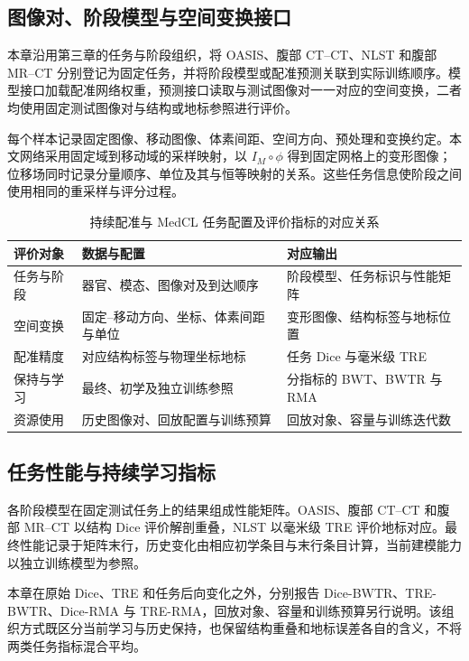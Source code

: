 \subsection{图像对、阶段模型与空间变换接口}

本章沿用第三章的任务与阶段组织，将 OASIS、腹部 CT--CT、NLST 和腹部 MR--CT 分别登记为固定任务，并将阶段模型或配准预测关联到实际训练顺序。模型接口加载配准网络权重，预测接口读取与测试图像对一一对应的空间变换，二者均使用固定测试图像对与结构或地标参照进行评价。

每个样本记录固定图像、移动图像、体素间距、空间方向、预处理和变换约定。本文网络采用固定域到移动域的采样映射，以 $I_M\circ\phi$ 得到固定网格上的变形图像；位移场同时记录分量顺序、单位及其与恒等映射的关系。这些任务信息使阶段之间使用相同的重采样与评分过程。

\begin{table}[htbp]
\centering
\caption{持续配准与 MedCL 任务配置及评价指标的对应关系}
\label{tab:samcl-platform-interface}
\thesistablefont
\renewcommand{\arraystretch}{1.16}
\setlength{\tabcolsep}{3pt}
\begin{tabularx}{\textwidth}{@{}p{2.4cm}XX@{}}
\toprule
评价对象 & 数据与配置 & 对应输出 \\
\midrule
任务与阶段 & 器官、模态、图像对及到达顺序 & 阶段模型、任务标识与性能矩阵 \\
空间变换 & 固定--移动方向、坐标、体素间距与单位 & 变形图像、结构标签与地标位置 \\
配准精度 & 对应结构标签与物理坐标地标 & 任务 Dice 与毫米级 TRE \\
保持与学习 & 最终、初学及独立训练参照 & 分指标的 BWT、BWTR 与 RMA \\
资源使用 & 历史图像对、回放配置与训练预算 & 回放对象、容量与训练迭代数 \\
\bottomrule
\end{tabularx}
\end{table}

\subsection{任务性能与持续学习指标}

各阶段模型在固定测试任务上的结果组成性能矩阵。OASIS、腹部 CT--CT 和腹部 MR--CT 以结构 Dice 评价解剖重叠，NLST 以毫米级 TRE 评价地标对应。最终性能记录于矩阵末行，历史变化由相应初学条目与末行条目计算，当前建模能力以独立训练模型为参照。

本章在原始 Dice、TRE 和任务后向变化之外，分别报告 Dice-BWTR、TRE-BWTR、Dice-RMA 与 TRE-RMA，回放对象、容量和训练预算另行说明。该组织方式既区分当前学习与历史保持，也保留结构重叠和地标误差各自的含义，不将两类任务指标混合平均。


